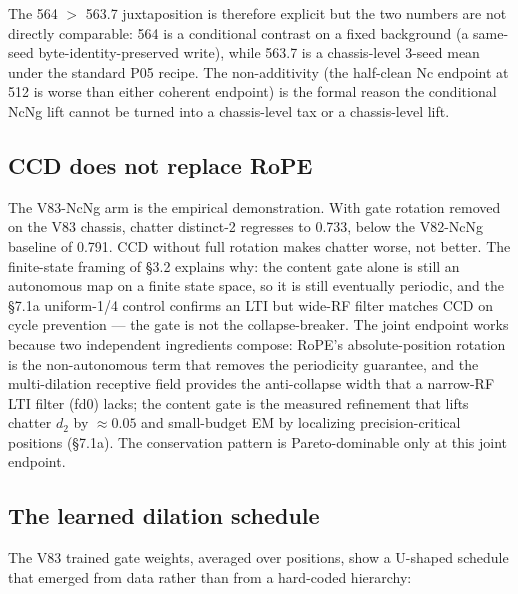 \documentclass[11pt]{article}
\begin{document}
The 564 $>$ 563.7 juxtaposition is therefore explicit but the two numbers are not directly comparable: 564 is a conditional contrast on a fixed background (a same-seed byte-identity-preserved write), while 563.7 is a chassis-level 3-seed mean under the standard P05 recipe. The non-additivity (the half-clean Nc endpoint at 512 is worse than either coherent endpoint) is the formal reason the conditional NcNg lift cannot be turned into a chassis-level tax or a chassis-level lift.

\subsection{CCD does not replace RoPE}

The V83-NcNg arm is the empirical demonstration. With gate rotation removed on the V83 chassis, chatter distinct-2 regresses to 0.733, below the V82-NcNg baseline of 0.791. CCD without full rotation makes chatter worse, not better. The finite-state framing of \S3.2 explains why: the content gate alone is still an autonomous map on a finite state space, so it is still eventually periodic, and the \S7.1a uniform-1/4 control confirms an LTI but wide-RF filter matches CCD on cycle prevention --- the gate is not the collapse-breaker. The joint endpoint works because two independent ingredients compose: RoPE's absolute-position rotation is the non-autonomous term that removes the periodicity guarantee, and the multi-dilation receptive field provides the anti-collapse width that a narrow-RF LTI filter (fd0) lacks; the content gate is the measured refinement that lifts chatter $d_2$ by $\approx 0.05$ and small-budget EM by localizing precision-critical positions (\S7.1a). The conservation pattern is Pareto-dominable only at this joint endpoint.

\subsection{The learned dilation schedule}

The V83 trained gate weights, averaged over positions, show a U-shaped schedule that emerged from data rather than from a hard-coded hierarchy:
\end{document}
